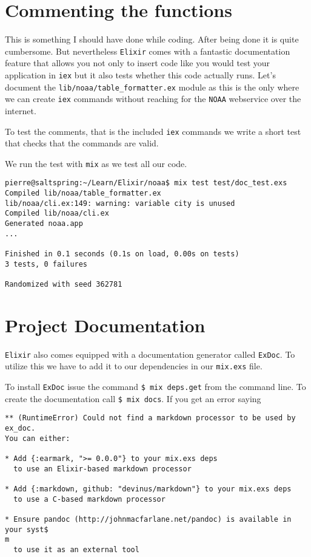 \documentclass[10pt, a4paper]{article}
\newcommand{\includecode}[3]{}
\begin{document}
\section{Commenting the functions}
This is something I should have done while coding. After being done it is 
quite cumbersome. But nevertheless \texttt{Elixir} comes with a fantastic
documentation feature that allows you not only to insert code like you 
would test your application in \texttt{iex} but it also tests whether this
code actually runs. Let's document the \texttt{lib/noaa/table\_formatter.ex}
module as this is the only where we can create \texttt{iex} commands without
reaching for the \texttt{NOAA} webservice over the internet.

\includecode{lib/noaa/table\_formatter.ex}{lst:tableformatter2}
            {listings/table-formatter2.ex}

To test the comments, that is the included \texttt{iex} commands we write a
short test that checks that the commands are valid.

\includecode{test/doc\_test.exs}{lst:doctest}{listings/doc-test.exs}

We run the test with \texttt{mix} as we test all our code.

\begin{verbatim}
pierre@saltspring:~/Learn/Elixir/noaa$ mix test test/doc_test.exs
Compiled lib/noaa/table_formatter.ex
lib/noaa/cli.ex:149: warning: variable city is unused
Compiled lib/noaa/cli.ex
Generated noaa.app
...

Finished in 0.1 seconds (0.1s on load, 0.00s on tests)
3 tests, 0 failures

Randomized with seed 362781 
\end{verbatim}

\section{Project Documentation}
\texttt{Elixir} also comes equipped with a documentation generator called
\texttt{ExDoc}. To utilize this we have to add it to our dependencies in our
\texttt{mix.exs} file.

\includecode{mix.exs}{lst:mix3}{listings/mix3.exs}

To install \texttt{ExDoc} issue the command \texttt{\$ mix deps.get} from
the command line. To create the documentation call \texttt{\$ mix docs}. If 
you get an error saying 

\begin{verbatim}
** (RuntimeError) Could not find a markdown processor to be used by ex_doc.
You can either:

* Add {:earmark, ">= 0.0.0"} to your mix.exs deps
  to use an Elixir-based markdown processor

* Add {:markdown, github: "devinus/markdown"} to your mix.exs deps
  to use a C-based markdown processor

* Ensure pandoc (http://johnmacfarlane.net/pandoc) is available in your syst$
m
  to use it as an external tool
\end{verbatim}
\end{document}
